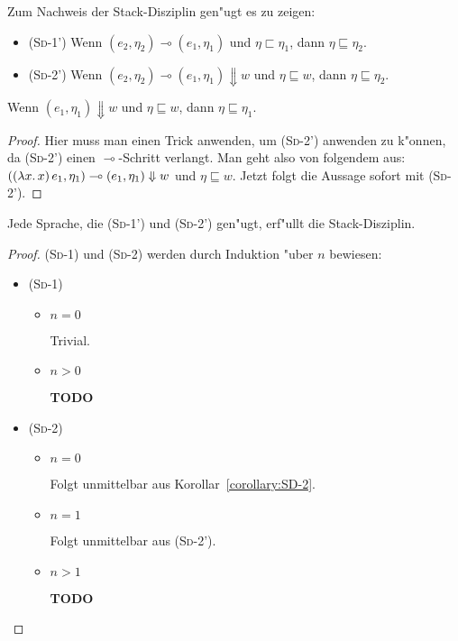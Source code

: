 \documentclass[12pt,fleqn,a4paper]{article}
\newcommand{\RN}[1]{\mbox{\textsc{(#1)}}}
\begin{document}
\begin{lemma}
  Zum Nachweis der Stack-Disziplin gen"ugt es zu zeigen:
  \begin{itemize}
  \item \RN{Sd-1'} Wenn $(e_2,\eta_2) \multimap (e_1,\eta_1)$ und $\eta \sqsubset \eta_1$, dann
    $\eta \sqsubseteq \eta_2$.
  \item \RN{Sd-2'} Wenn $(e_2,\eta_2) \multimap (e_1,\eta_1) \Downarrow w$ und
    $\eta \sqsubseteq w$, dann $\eta \sqsubseteq \eta_2$.
  \end{itemize}
\end{lemma}

\begin{corollary} \label{corollary:SD-2}
  Wenn $(e_1,\eta_1) \Downarrow w$ und $\eta \sqsubseteq w$, dann $\eta \sqsubseteq \eta_1$.
\end{corollary}

\begin{proof}
  Hier muss man einen Trick anwenden, um \RN{Sd-2'} anwenden zu k"onnen, da \RN{Sd-2'} einen
  $\multimap$-Schritt verlangt. Man geht also von folgendem aus:
  $((\lambda x.\,x)\,e_1,\eta_1) \multimap (e_1,\eta_1) \Downarrow w$ und $\eta \sqsubseteq w$.
  Jetzt folgt die Aussage sofort mit \RN{Sd-2'}.
\end{proof}

\begin{theorem}
  Jede Sprache, die \RN{Sd-1'} und \RN{Sd-2'} gen"ugt, erf"ullt die Stack-Disziplin.
\end{theorem}

\begin{proof}
  \RN{Sd-1} und \RN{Sd-2} werden durch Induktion "uber $n$ bewiesen:
  \begin{itemize}
  \item \RN{Sd-1}
    \begin{itemize}
    \item $n = 0$

      Trivial.

    \item $n > 0$

      \textbf{TODO}
    \end{itemize}

  \item \RN{Sd-2}
    \begin{itemize}
    \item $n = 0$ 

      Folgt unmittelbar aus Korollar~\ref{corollary:SD-2}.

    \item $n = 1$

      Folgt unmittelbar aus \RN{Sd-2'}.

    \item $n > 1$

      \textbf{TODO}
    \end{itemize}
  \end{itemize}
\end{proof}
\end{document}
